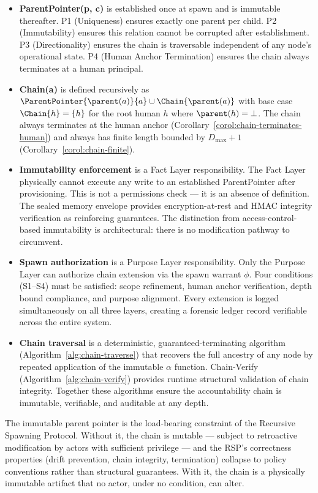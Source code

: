 \begin{itemize}[noitemsep]
    \item \textbf{ParentPointer(p, c)} is established once at spawn and is immutable thereafter. P1 (Uniqueness) ensures exactly one parent per child. P2 (Immutability) ensures this relation cannot be corrupted after establishment. P3 (Directionality) ensures the chain is traversable independent of any node's operational state. P4 (Human Anchor Termination) ensures the chain always terminates at a human principal.

    \item \textbf{Chain(a)} is defined recursively as $\ParentPointer{\parent(a)}{a} \cup \Chain{\parent(a)}$ with base case $\Chain{h} = \{h\}$ for the root human $h$ where $\parent(h) = \bot$. The chain always terminates at the human anchor (Corollary~\ref{corol:chain-terminates-human}) and always has finite length bounded by $D_{\max} + 1$ (Corollary~\ref{corol:chain-finite}).

    \item \textbf{Immutability enforcement} is a Fact Layer responsibility. The Fact Layer physically cannot execute any write to an established ParentPointer after provisioning. This is not a permissions check --- it is an absence of definition. The sealed memory envelope provides encryption-at-rest and HMAC integrity verification as reinforcing guarantees. The distinction from access-control-based immutability is architectural: there is no modification pathway to circumvent.

    \item \textbf{Spawn authorization} is a Purpose Layer responsibility. Only the Purpose Layer can authorize chain extension via the spawn warrant $\phi$. Four conditions (S1--S4) must be satisfied: scope refinement, human anchor verification, depth bound compliance, and purpose alignment. Every extension is logged simultaneously on all three layers, creating a forensic ledger record verifiable across the entire system.

    \item \textbf{Chain traversal} is a deterministic, guaranteed-terminating algorithm (Algorithm~\ref{alg:chain-traverse}) that recovers the full ancestry of any node by repeated application of the immutable $\alpha$ function. Chain-Verify (Algorithm~\ref{alg:chain-verify}) provides runtime structural validation of chain integrity. Together these algorithms ensure the accountability chain is immutable, verifiable, and auditable at any depth.
\end{itemize}

The immutable parent pointer is the load-bearing constraint of the Recursive Spawning Protocol. Without it, the chain is mutable --- subject to retroactive modification by actors with sufficient privilege --- and the RSP's correctness properties (drift prevention, chain integrity, termination) collapse to policy conventions rather than structural guarantees. With it, the chain is a physically immutable artifact that no actor, under no condition, can alter.